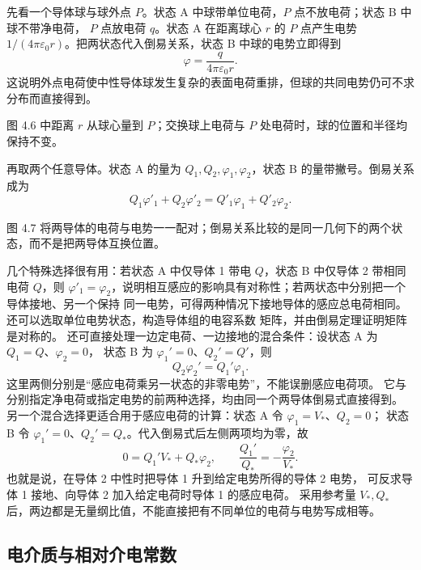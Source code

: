先看一个导体球与球外点 $P$。状态 A 中球带单位电荷，$P$ 点不放电荷；状态 B 中球不带净电荷，
$P$ 点放电荷 $q$。状态 A 在距离球心 $r$ 的 $P$ 点产生电势
$1/(4\pi\varepsilon_0r)$。把两状态代入倒易关系，状态 B 中球的电势立即得到
\[
  \varphi=\frac{q}{4\pi\varepsilon_0r}.
\]
这说明外点电荷使中性导体球发生复杂的表面电荷重排，但球的共同电势仍可不求分布而直接得到。

图 4.6 中距离 $r$ 从球心量到 $P$；交换球上电荷与 $P$ 处电荷时，球的位置和半径均保持不变。

\greenSphereFigure
{}

再取两个任意导体。状态 A 的量为 $Q_1,Q_2,\varphi_1,\varphi_2$，状态 B 的量带撇号。倒易关系成为
\begin{equation}
  \boxed{Q_1\varphi'_1+Q_2\varphi'_2
   =Q'_1\varphi_1+Q'_2\varphi_2}.
\end{equation}

图 4.7 将两导体的电荷与电势一一配对；倒易关系比较的是同一几何下的两个状态，而不是把两导体互换位置。

\greenTwoConductorFigure
{}

几个特殊选择很有用：若状态 A 中仅导体 1 带电 $Q$，状态 B 中仅导体 2 带相同电荷 $Q$，则
$\varphi'_1=\varphi_2$，说明相互感应的影响具有对称性；若两状态中分别把一个导体接地、另一个保持
同一电势，可得两种情况下接地导体的感应总电荷相同。还可以选取单位电势状态，构造导体组的电容系数
矩阵，并由倒易定理证明矩阵是对称的。
还可直接处理一边定电荷、一边接地的混合条件：设状态 A 为 $Q_1=Q$、$\varphi_2=0$，
状态 B 为 $\varphi_1'=0$、$Q_2'=Q'$，则
\[
 Q_2\varphi_2'=Q_1'\varphi_1.
\]
这里两侧分别是“感应电荷乘另一状态的非零电势”，不能误删感应电荷项。
它与分别指定净电荷或指定电势的前两种选择，均由同一个两导体倒易式直接得到。
另一个混合选择更适合用于感应电荷的计算：状态 A 令 $\varphi_1=V_*$、$Q_2=0$；
状态 B 令 $\varphi_1'=0$、$Q_2'=Q_*$。代入倒易式后左侧两项均为零，故
\[
 0=Q_1'V_*+Q_*\varphi_2,\qquad
 \boxed{\frac{Q_1'}{Q_*}=-\frac{\varphi_2}{V_*}}.
\]
也就是说，在导体 2 中性时把导体 1 升到给定电势所得的导体 2 电势，
可反求导体 1 接地、向导体 2 加入给定电荷时导体 1 的感应电荷。
采用参考量 $V_*,Q_*$ 后，两边都是无量纲比值，不能直接把有不同单位的电荷与电势写成相等。

\subsection*{电介质与相对介电常数}

